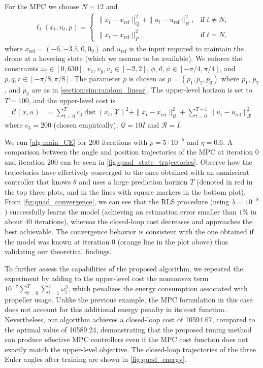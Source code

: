 \documentclass[journal,twoside,web,final]{ieeecolor}
\theoremstyle{definition}
\begin{document}
For the MPC we choose $N=12$ and
\begin{align*}
\ell_t(x_t,u_t,p) =
\begin{cases}
\|x_t-x_\text{ref}\|_Q^2 + \|u_t-u_\text{ref}\|_R^2, & \text{if } t \neq N,\\
\|x_t-x_\text{ref}\|_P^2, & \text{if } t = N,
\end{cases}
\end{align*}
where $x_\text{ref}=(-6,-3.5,0,0_9)$ and $u_\text{ref}$ is the input required to maintain the drone at a hovering state (which we assume to be available).
We enforce the constraints $\omega_i\in [0,630]$, $v_x,v_y,v_z\in[-2,2]$, $\phi,\vartheta,\psi\in [-\pi/4,\pi/4]$, and $p,q,r\in[-\pi/8,\pi/8]$.
The parameter $p$ is chosen as $p=(p_1,p_2,p_3)$ where $p_1$, $p_2$, and $p_3$ are as in \cref{section:sim:random_linear}. 
The upper-level horizon is set to $T=100$, and the upper-level cost is 
\begin{align*}
\mathcal{C}(x,u) & = \sum_{t=0}^{T} c_3\operatorname*{dist}(x_t,\mathcal{X})^2 + \|x_t-x_\text{ref}\|^2_{\mathcal{Q}}+ \sum_{t=0}^{T-1} \|u_t-u_\text{ref}\|^2_{\mathcal{R}}
\end{align*}
where $c_3=200$ (chosen empirically), $\mathcal{Q}=10I$ and $\mathcal{R}=I$.

We run \cref{alg:main_CE} for $200$ iterations with $\rho=5\cdot 10^{-5}$ and $\eta=0.6$. A comparison between the angle and position trajectories of the MPC at iteration $0$ and iteration $200$ can be seen in \cref{fig:quad_state_trajectories}. Observe how the trajectories have effectively converged to the ones obtained with an omniscient controller that knows $\theta$ and uses a large prediction horizon $T$ (denoted in red in the top three plots, and in the lines with square markers in the bottom plot).
From \cref{fig:quad_convergence}, we can see that the RLS procedure (using $\lambda=10^{-8}$) successfully learns the model (achieving an estimation error smaller than $1\%$ in about $40$ iterations), whereas the closed-loop cost decreases and approaches the best achievable.
The convergence behavior is consistent with the one obtained if the model was known at iteration 0 (orange line in the plot above) thus validating our theoretical findings.

To further assess the capabilities of the proposed algorithm, we repeated the experiment by adding to the upper-level cost the nonconvex term $10^{-7}\sum_{t=0}^T \sum_{i=1}^4 \omega_i^3$, which penalizes the energy consumption associated with propeller usage.
Unlike the previous example, the MPC formulation in this case does not account for this additional energy penalty in its cost function.
Nevertheless, our algorithm achieves a closed-loop cost of 10594.67, compared to the optimal value of 10589.24, demonstrating that the proposed tuning method can produce effective MPC controllers even if the MPC cost function does not exactly match the upper-level objective.
The closed-loop trajectories of the three Euler angles after training are shown in \cref{fig:quad_energy}.
\end{document}
